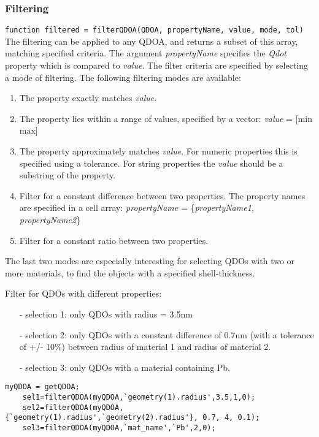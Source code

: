 \subsubsection{Filtering}
\lstinline{function filtered = filterQDOA(QDOA, propertyName, value, mode, tol)}\\

The filtering can be applied to any QDOA, and returns a subset of this array, matching specified criteria. The argument \textit{propertyName} specifies the \textit{Qdot} property which is compared to \textit{value}. The filter criteria are specified by selecting a mode of filtering. The following filtering modes are available:

\begin{enumerate}
	\item The property exactly matches \textit{value}.
	\item The property lies within a range of values, specified by a vector: \textit{value} = [min max]
	\item The property approximately matches \textit{value}. For numeric properties this is specified using a tolerance. For string properties the \textit{value} should be a substring of the property.
	\item Filter for a constant difference between two properties. The property names are specified in a cell array: \textit{propertyName} 
	= \{\textit{propertyName1, propertyName2}\}
	\item Filter for a constant ratio between two properties.
\end{enumerate}
The last two modes are especially interesting for selecting QDOs with two or more materials, to find the objects with a specified shell-thickness.\\

\begin{EXAMPLE}
	Filter for QDOs with different properties:
	\begin{itemize}
	\item[-] selection 1: only QDOs with radius = 3.5nm
	\item[-] selection 2: only QDOs with a constant difference of 0.7nm (with a tolerance of +/- 10\%) between radius of material 1 and radius of material 2.
	\item[-] selection 3: only QDOs with a material containing Pb.
	\end{itemize}
	\begin{lstlisting}[frame = none]
	myQDOA = getQDOA;
	sel1=filterQDOA(myQDOA,`geometry(1).radius',3.5,1,0);
	sel2=filterQDOA(myQDOA,{`geometry(1).radius',`geometry(2).radius'}, 0.7, 4, 0.1);
	sel3=filterQDOA(myQDOA,`mat_name',`Pb',2,0); \end{lstlisting}
\end{EXAMPLE}

